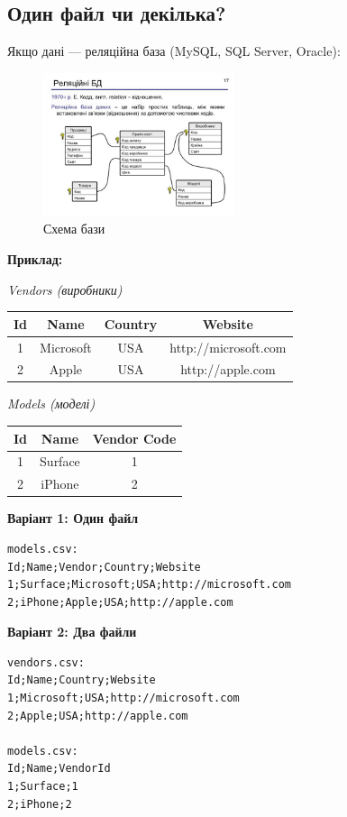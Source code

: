 \subsection{Один файл чи декілька?}

Якщо дані — реляційна база (MySQL, SQL Server, Oracle):

\begin{figure}[h]
    \centering
    \includegraphics[width=0.5\textwidth]{images/009.jpg}
    \caption{Схема бази}
\end{figure}

\textbf{Приклад:}

\textit{Vendors (виробники)}

\begin{tabular}{|c|c|c|c|}
\hline
Id & Name      & Country & Website              \\
\hline
1  & Microsoft & USA     & http://microsoft.com \\
2  & Apple     & USA     & http://apple.com     \\
\hline
\end{tabular}

\textit{Models (моделі)}

\begin{tabular}{|c|c|c|}
\hline
Id & Name    & Vendor Code \\
\hline
1  & Surface & 1           \\
2  & iPhone  & 2           \\
\hline
\end{tabular}

\textbf{Варіант 1: Один файл}

\begin{verbatim}
models.csv:
Id;Name;Vendor;Country;Website
1;Surface;Microsoft;USA;http://microsoft.com
2;iPhone;Apple;USA;http://apple.com
\end{verbatim}

\textbf{Варіант 2: Два файли}

\begin{verbatim}
vendors.csv:
Id;Name;Country;Website
1;Microsoft;USA;http://microsoft.com
2;Apple;USA;http://apple.com

models.csv:
Id;Name;VendorId
1;Surface;1
2;iPhone;2
\end{verbatim}


